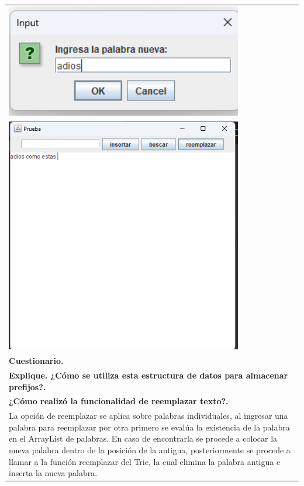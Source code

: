 \documentclass[9pt]{article}
\begin{document}
\begin{longtable}{|p{15cm}|}
		\includegraphics[width=0.8\textwidth,keepaspectratio]{img/reemplazando2.png}\\
		\includegraphics[width=0.8\textwidth,keepaspectratio]{img/reemplazo.png}\\
		\textbf{Cuestionario.}  \\
		\textbf{Explique. ¿Cómo se utiliza esta estructura de datos para almacenar prefijos?.}  \\
		
		\textbf{¿Cómo realizó la funcionalidad de reemplazar texto?.}  \\
		La opción de reemplazar se aplica sobre palabras individuales, al ingresar una palabra para reemplazar por otra primero se evalúa la existencia de la palabra en el ArrayList de palabras. En caso de encontrarla se procede a colocar la nueva palabra dentro de la posición de la antigua, posteriormente se procede a llamar a la función reemplazar del Trie, la cual elimina la palabra antigua e inserta la nueva palabra.\\
		\hline
	\end{longtable}
\end{document}
